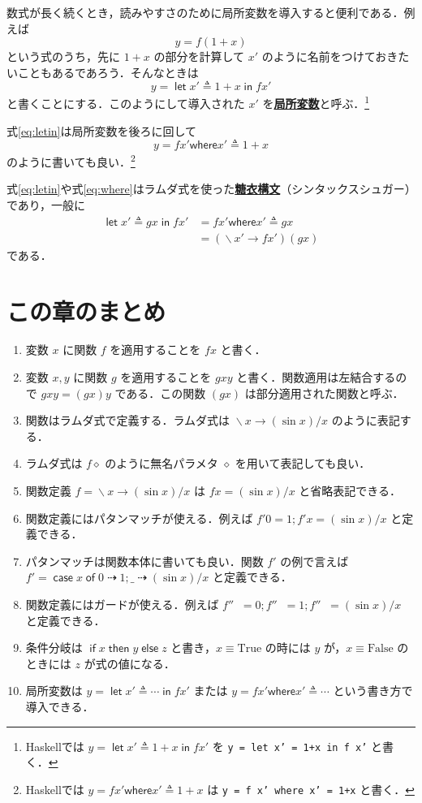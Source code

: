\documentclass[a4paper,twocolumn]{jsbook}
\newcommand{\programminglanguage}[1]{\textsf{#1}}
\newcommand{\haskell}{\programminglanguage{Haskell}}
\newcommand{\keyword}[1]{{\underline{\textbf{#1}}}}
\newcommand{\code}[1]{\texttt{#1}}
\newcommand{\mKeyword}[1]{\mathsf{#1}} %
\newcommand{\mIfKeyword}{\mKeyword{if}}
\newcommand{\mCaseKeyword}{\mKeyword{case}}
\newcommand{\mElseKeyword}{\mKeyword{else}}
\newcommand{\mInKeyword}{\mKeyword{in}}
\newcommand{\mLetKeyword}{\mKeyword{let}}
\newcommand{\mOfKeyword}{\mKeyword{of}}
\newcommand{\mOtherwiseKeyword}{\mKeyword{otherwise}}
\newcommand{\mThenKeyword}{\mKeyword{then}}
\newcommand{\mWhereKeyword}{\mKeyword{where}}
\DeclareMathOperator{\mCaseKW}{\mCaseKeyword} %
\DeclareMathOperator{\mElse}{\mElseKeyword}
\DeclareMathOperator{\mIf}{\mIfKeyword}
\DeclareMathOperator{\mInKW}{\mInKeyword} %
\DeclareMathOperator{\mLetKW}{\mLetKeyword} %
\DeclareMathOperator{\mOfKW}{\mOfKeyword} %
\DeclareMathOperator{\mOtherwise}{\mOtherwiseKeyword}
\DeclareMathOperator{\mThen}{\mThenKeyword}
\newcommand{\mSpecialConstant}[1]{\textrm{#1}} %
\newcommand{\mFalse}{\mSpecialConstant{False}}
\newcommand{\mTrue}{\mSpecialConstant{True}}
\newcommand{\mAnyParam}{\_}
\newcommand{\mAnonParam}{\diamond}
\DeclareMathOperator{\mIfSo}{\dashrightarrow}
\DeclareMathOperator{\mLambda}{\backslash}
\DeclareMathOperator{\mLambdaArrow}{\rightarrow}
\DeclareMathOperator{\mLetEq}{\triangleq}
\newcommand{\mGuard}[1]{\mathop{\mid_{#1}}}
\newcommand{\mCaseOf}[1]{\mCaseKW#1\mOfKW}
\newcommand{\mIfThenElse}[3]{\mIf{#1}\mThen{#2}\mElse{#3}}
\newcommand{\mLambdaExp}[2]{\mLambda{#1}\mLambdaArrow{#2}}
\newcommand{\mLetIn}[3]{\mLetKW#1\mLetEq#2\mInKW{#3}}
\newcommand{\mWhereIs}[2]{\mathbin{\mWhereKeyword}#1\mLetEq#2}
\begin{document}
数式が長く続くとき，読みやすさのために局所変数を導入すると便利である．例えば
\begin{equation}
y=f(1+x)
\end{equation}
という式のうち，先に $1+x$ の部分を計算して $x'$ のように名前をつけておきたいこともあるであろう．そんなときは
\begin{equation}
\label{eq:letin}
y=\mLetIn{x'}{1+x}{fx'}
\end{equation}
と書くことにする．このようにして導入された $x'$ を\keyword{局所変数}と呼ぶ．\footnote{\haskell では $y=\mLetIn{x'}{1+x}{fx'}$ を \code{y = let x' = 1+x in f x'} と書く．}

式\eqref{eq:letin}は局所変数を後ろに回して
\begin{equation}
\label{eq:where}
y=fx'\mWhereIs{x'}{1+x}
\end{equation}
のように書いても良い．\footnote{\haskell では $y=fx'\mWhereIs{x'}{1+x}$ は \code{y = f x' where x' = 1+x} と書く．}

式\eqref{eq:letin}や式\eqref{eq:where}はラムダ式を使った\keyword{糖衣構文}（シンタックスシュガー）であり，一般に
\begin{align}
\mLetIn{x'}{gx}{fx'}
&=fx'\mWhereIs{x'}{gx}\\
&=(\mLambdaExp{x'}{fx'})(gx)
\end{align}
である．

\section{この章のまとめ}

\begin{enumerate}
\item 変数 $x$ に関数 $f$ を適用することを $fx$ と書く．
\item 変数 $x,y$ に関数 $g$ を適用することを $gxy$ と書く．関数適用は左結合するので $gxy=(gx)y$ である．この関数 $(gx)$ は部分適用された関数と呼ぶ．
\item 関数はラムダ式で定義する．ラムダ式は $\mLambdaExp{x}{(\sin x)/x}$ のように表記する．
\item ラムダ式は $f\mAnonParam$ のように無名パラメタ $\mAnonParam$ を用いて表記しても良い．
\item 関数定義 $f=\mLambdaExp{x}{(\sin x)/x}$ は $fx=(\sin x)/x$ と省略表記できる．
\item 関数定義にはパタンマッチが使える．例えば $f'0=1;f'x=(\sin x)/x$ と定義できる．
\item パタンマッチは関数本体に書いても良い．関数 $f'$ の例で言えば $f'=\mCaseOf{x}0\mIfSo1;\mAnyParam\mIfSo(\sin x)/x$ と定義できる．
\item 関数定義にはガードが使える．例えば $f''\mGuard{x<0}=0;f''\mGuard{x\equiv0}=1;f''\mGuard{\mOtherwise}=(\sin x)/x$ と定義できる．
\item 条件分岐は $\mIfThenElse{x}{y}{z}$ と書き，$x\equiv\mTrue$ の時には $y$ が，$x\equiv\mFalse$ のときには $z$ が式の値になる．
\item 局所変数は $y=\mLetIn{x'}{\dotsb}{fx'}$ または $y=fx'\mWhereIs{x'}{\dotsb}$ という書き方で導入できる．
\end{enumerate}
\end{document}
